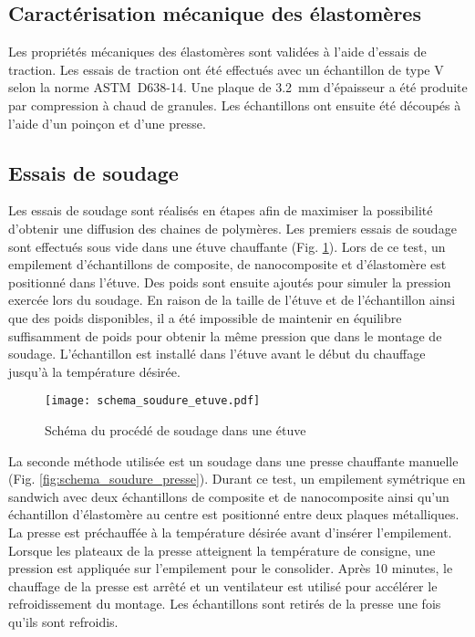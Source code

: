 \subsection{Caractérisation mécanique des élastomères}

Les propriétés mécaniques des élastomères sont validées à l'aide d'essais de traction. 
Les essais de traction ont été effectués avec un échantillon de type V selon la norme ASTM~D638-14. 
Une plaque de \SI[locale=FR]{3.2}{\milli\metre} d'épaisseur a été produite par compression à chaud de granules. 
Les échantillons ont ensuite été découpés à l'aide d'un poinçon et d'une presse. 

\subsection{Essais de soudage}

Les essais de soudage sont réalisés en étapes afin de maximiser la possibilité d'obtenir une diffusion des chaines de polymères. 
Les premiers essais de soudage sont effectués sous vide dans une étuve chauffante (Fig. \ref{fig:schema_soudure_etuve}). 
Lors de ce test, un empilement d'échantillons de composite, de nanocomposite et d'élastomère est positionné dans l'étuve. 
Des poids sont ensuite ajoutés pour simuler la pression exercée lors du soudage. 
En raison de la taille de l'étuve et de l'échantillon ainsi que des poids disponibles, il a été impossible de maintenir en équilibre suffisamment de poids pour obtenir la même pression que dans le montage de soudage. 
L'échantillon est installé dans l'étuve avant le début du chauffage jusqu'à la température désirée. 

\begin{figure}[h]
	\centering
	\texttt{[image: schema\_soudure\_etuve.pdf]}
	\caption{Schéma du procédé de soudage dans une étuve}
	\label{fig:schema_soudure_etuve}
\end{figure}

La seconde méthode utilisée est un soudage dans une presse chauffante manuelle (Fig. \ref{fig:schema_soudure_presse}). 
Durant ce test, un empilement symétrique en sandwich avec deux échantillons de composite et de nanocomposite ainsi qu'un échantillon d'élastomère au centre est positionné entre deux plaques métalliques. 
La presse est préchauffée à la température désirée avant d'insérer l'empilement. 
Lorsque les plateaux de la presse atteignent la température de consigne, une pression est appliquée sur l'empilement pour le consolider. 
Après 10 minutes, le chauffage de la presse est arrêté et un ventilateur est utilisé pour accélérer le refroidissement du montage. 
Les échantillons sont retirés de la presse une fois qu'ils sont refroidis. 

